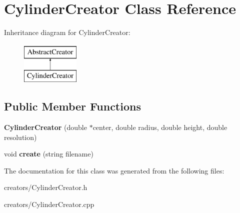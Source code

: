 \hypertarget{class_cylinder_creator}{}\section{Cylinder\+Creator Class Reference}
\label{class_cylinder_creator}
Inheritance diagram for Cylinder\+Creator\+:\begin{figure}[H]
\begin{center}
\leavevmode
\includegraphics[height=2.000000cm]{class_cylinder_creator}
\end{center}
\end{figure}
\subsection*{Public Member Functions}
\begin{DoxyCompactItemize}
\item 
\mbox{\label{class_cylinder_creator_a29d3bf6824419816977cbc1d171bde3a}} 
{\bfseries Cylinder\+Creator} (double $\ast$center, double radius, double height, double resolution)
\item 
\mbox{\label{class_cylinder_creator_ae4da1cf60c40253ab7f677d8d708eefe}} 
void {\bfseries create} (string filename)
\end{DoxyCompactItemize}


The documentation for this class was generated from the following files\+:\begin{DoxyCompactItemize}
\item 
creators/Cylinder\+Creator.\+h\item 
creators/Cylinder\+Creator.\+cpp\end{DoxyCompactItemize}
